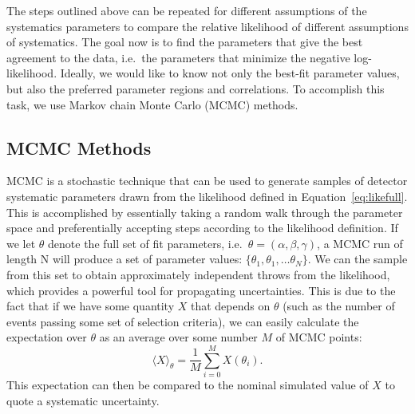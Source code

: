 The steps outlined above can be repeated for different assumptions of the
systematics parameters to compare the relative likelihood of different
assumptions of systematics.  The goal now is to find the parameters that give
the best agreement to the data, i.e.\ the parameters that minimize the negative
log-likelihood.  Ideally, we would like to know not only the best-fit parameter
values, but also the preferred parameter regions and correlations.  To
accomplish this task, we use Markov chain Monte Carlo (MCMC) methods.



\subsection{MCMC Methods}
\label{subsec:mcmc}

MCMC is a stochastic technique that can be used to generate samples of detector
systematic parameters drawn from the likelihood defined in
Equation~\ref{eq:likefull}.  This is accomplished by essentially taking a
random walk through the parameter space and preferentially accepting steps
according to the likelihood definition. If we let $\theta$ denote the full set
of fit parameters, i.e.\ $\theta = (\alpha,\beta,\gamma)$, a MCMC run of length
N will produce a set of parameter values: $\{\theta_{1}, \theta_{1}, \dots
\theta_{N}\}$.  We can the sample from this set to obtain approximately
independent throws from the likelihood, which provides a powerful tool for
propagating uncertainties.  This is due to the fact that if we have some
quantity $X$ that depends on $\theta$ (such as the number of events passing
some set of selection criteria), we can easily calculate the expectation over
$\theta$ as an average over some number $M$ of MCMC points:
%
\begin{equation}
  \label{eq:mcmcexp}
  \langle X \rangle_{\theta} = \frac{1}{M}\sum\limits_{i=0}^{M}X(\theta_{i}).
\end{equation}
%
This expectation can then be compared to the nominal simulated value of $X$ to
quote a systematic uncertainty.

